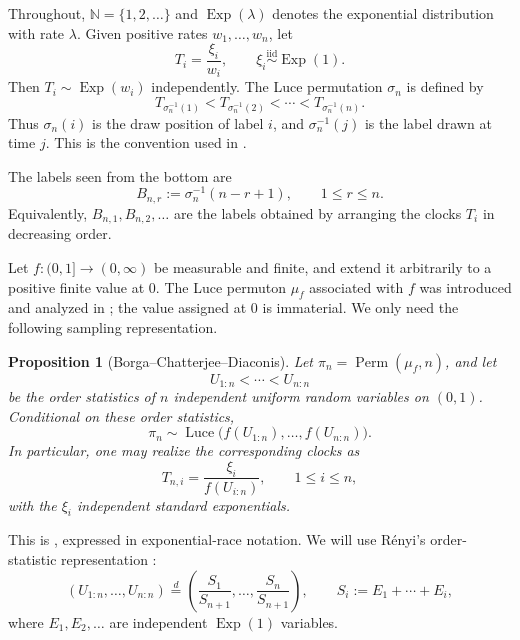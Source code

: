 \documentclass[11pt]{article}
\numberwithin{equation}{section}
\newtheorem{proposition}[theorem]{Proposition}
\theoremstyle{definition}
\theoremstyle{remark}
\newcommand{\N}{\mathbb N}
\newcommand{\Exp}{\operatorname{Exp}}
\newcommand{\Perm}{\operatorname{Perm}}
\newcommand{\Luce}{\operatorname{Luce}}
\begin{document}
Throughout, $\N=\{1,2,\ldots\}$ and $\Exp(\lambda)$ denotes the exponential distribution with rate $\lambda$.  Given positive rates $w_1,\ldots,w_n$, let
\[
  T_i=\frac{\xi_i}{w_i},
  \qquad \xi_i\stackrel{\mathrm{iid}}{\sim}\Exp(1).
\]
Then $T_i\sim\Exp(w_i)$ independently.  The Luce permutation $\sigma_n$ is defined by
\[
  T_{\sigma_n^{-1}(1)}<T_{\sigma_n^{-1}(2)}<\cdots<T_{\sigma_n^{-1}(n)}.
\]
Thus $\sigma_n(i)$ is the draw position of label $i$, and $\sigma_n^{-1}(j)$ is the label drawn at time $j$.  This is the convention used in \cite{BCD}.

The labels seen from the bottom are
\begin{equation}
  B_{n,r}:=\sigma_n^{-1}(n-r+1),
  \qquad 1\leq r\leq n.
  \label{eq:bottom-definition}
\end{equation}
Equivalently, $B_{n,1},B_{n,2},\ldots$ are the labels obtained by arranging the clocks $T_i$ in decreasing order.

Let $f:(0,1]\to(0,\infty)$ be measurable and finite, and extend it arbitrarily to a positive finite value at $0$.  The Luce permuton $\mu_f$ associated with $f$ was introduced and analyzed in \cite{BCD}; the value assigned at $0$ is immaterial.  We only need the following sampling representation.

\begin{proposition}[Borga--Chatterjee--Diaconis]
\label{prop:bcd-representation}
Let $\pi_n=\Perm(\mu_f,n)$, and let
\[
  U_{1:n}<\cdots<U_{n:n}
\]
be the order statistics of $n$ independent uniform random variables on $(0,1)$.  Conditional on these order statistics,
\[
  \pi_n\sim \Luce\bigl(f(U_{1:n}),\ldots,f(U_{n:n})\bigr).
\]
In particular, one may realize the corresponding clocks as
\begin{equation}
  T_{n,i}=\frac{\xi_i}{f(U_{i:n})},
  \qquad 1\leq i\leq n,
  \label{eq:conditional-clocks}
\end{equation}
with the $\xi_i$ independent standard exponentials.
\end{proposition}

This is \cite[Proposition~2.2]{BCD}, expressed in exponential-race notation.  We will use R\'enyi's order-statistic representation \cite{Renyi}:
\begin{equation}
  (U_{1:n},\ldots,U_{n:n})
  \stackrel{d}{=}
  \left(\frac{S_1}{S_{n+1}},\ldots,\frac{S_n}{S_{n+1}}\right),
  \qquad S_i:=E_1+\cdots+E_i,
  \label{eq:renyi}
\end{equation}
where $E_1,E_2,\ldots$ are independent $\Exp(1)$ variables.
\end{document}
